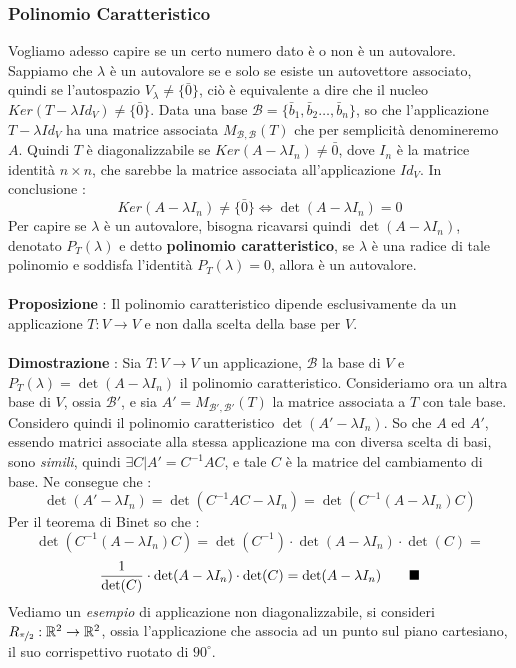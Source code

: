 \documentclass[12pt, letterpaper]{article}
\newcommand{\R}{{\mathbb R}}
\newcommand{\B}{{\mathcal B}}
\newcommand{\spaz}{{\text{\hphantom{aa}}}}
\newcommand{\acc}{\\\hphantom{}\\}
\begin{document}
\subsubsection{Polinomio Caratteristico}
Vogliamo adesso capire se un certo numero dato è o non è un autovalore. Sappiamo che \(\lambda\) è un autovalore 
se e solo se esiste un autovettore associato, quindi se l'autospazio \(V_\lambda\ne\{\bar 0\}\), ciò è equivalente 
a dire che il nucleo \(Ker(T-\lambda Id_V)\ne \{\bar 0\}\). Data una base \(\B=\{\bar b_1,\bar b_2\dots,\bar b_n\}\), so che l'applicazione \(T-\lambda Id_V\) 
ha una matrice associata \(M_{\B,\B}(T)\) che per semplicità denomineremo \(A\). Quindi 
\(T\) è diagonalizzabile se \(Ker(A-\lambda I_n)\ne \bar 0\), dove \(I_n\) è la matrice identità \(n\times n\), che sarebbe 
la matrice associata all'applicazione \(Id_V\). In conclusione :
$$Ker(A-\lambda I_n)\ne \{\bar 0\}\iff \det(A-\lambda I_n)=0$$
Per capire se \(\lambda\) è un autovalore, bisogna ricavarsi quindi \(\det(A-\lambda I_n)\), denotato \(P_T(\lambda)\) 
e detto \textbf{polinomio caratteristico}, se \(\lambda\) è una radice di tale polinomio e soddisfa l'identità 
\(P_T(\lambda)=0\), allora è un autovalore.\acc 
\textbf{Proposizione} : Il polinomio caratteristico dipende esclusivamente da un applicazione \(T:V\rightarrow V\) e non 
dalla scelta della base per \(V\).\acc 
\textbf{Dimostrazione} : Sia \(T:V\rightarrow V\) un applicazione, \(\B\) la base di \(V\) e \(P_T(\lambda)=\det(A-\lambda I_n)\) 
il polinomio caratteristico. Consideriamo ora un altra base di \(V\), ossia \(\B'\), e sia 
\(A'=M_{\B',\B'}(T)\) la matrice associata a \(T\) con tale base. Considero quindi il polinomio 
caratteristico \(\det(A'-\lambda I_n)\). So che \(A\) ed \(A'\), essendo matrici associate alla stessa applicazione ma con 
diversa scelta di basi, sono \textit{simili}, quindi \(\exists C|A'=C^{-1}AC\), e tale \(C\) è la matrice 
del cambiamento di base. Ne consegue che : 
$$\det(A'-\lambda I_n)=\det(C^{-1}AC-\lambda I_n)=\det(C^{-1}(A-\lambda I_n)C)$$
Per il teorema di Binet so che :
$$\det(C^{-1}(A-\lambda I_n)C)=\det(C^{-1})\cdot\det(A-\lambda I_n)\cdot\det(C)=$$
$$\dfrac{1}{\det(C)}\cdot\det(A-\lambda I_n)\cdot\det(C)=\det(A-\lambda I_n)\spaz\spaz \blacksquare$$
Vediamo un \textit{esempio} di applicazione non diagonalizzabile, si consideri \(R_{\nicefrac{\pi}{2}}:\R^2\rightarrow\R^2\), ossia 
l'applicazione che associa ad un punto sul piano cartesiano, il suo corrispettivo ruotato di \(90^\circ\).\begin{figure}[h]
    \end{figure}\\
\end{document}
